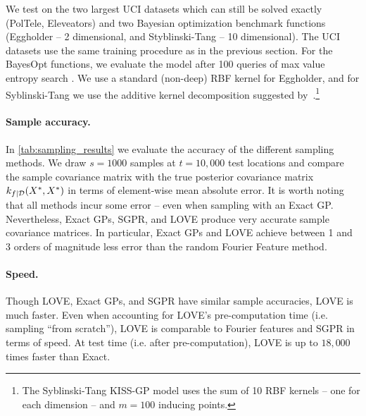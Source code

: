 We test on the two largest UCI datasets which can still be solved exactly (PolTele, Eleveators) and two Bayesian optimization benchmark functions (Eggholder -- 2 dimensional, and Styblinski-Tang -- 10 dimensional).
The UCI datasets use the same training procedure as in the previous section.
For the BayesOpt functions, we evaluate the model after 100 queries of max value entropy search \cite{wang2017max}.
We use a standard (non-deep) RBF kernel for Eggholder, and for Syblinski-Tang we use the additive kernel decomposition suggested by~\citet{kandasamy2015high}.\footnote{
  The Syblinski-Tang KISS-GP model uses the sum of 10 RBF kernels -- one for each dimension -- and $m=100$ inducing points.
}

\paragraph{Sample accuracy.}
In \cref{tab:sampling_results} we evaluate the accuracy of the different sampling methods.
We draw $s\!=\!1000$ samples at $t\!=\!10,\!000$ test locations and compare the sample covariance matrix with the true posterior covariance matrix $k_{f\mid\mathcal D}(X^*,X^*)$ in terms of element-wise mean absolute error.
It is worth noting that all methods incur some error -- even when sampling with an Exact GP.
Nevertheless, Exact GPs, SGPR, and LOVE{} produce very accurate sample covariance matrices.
In particular, Exact GPs and LOVE{} achieve between 1 and 3 orders of magnitude less error than the random Fourier Feature method.

\paragraph{Speed.}
Though LOVE{}, Exact GPs, and SGPR have similar sample accuracies, LOVE{} is much faster.
Even when accounting for LOVE's pre-computation time (i.e. sampling ``from scratch''), LOVE{} is comparable to Fourier features and SGPR in terms of speed.
At test time (i.e. after pre-computation), LOVE{} is up to $18,\!000$ times faster than Exact.

